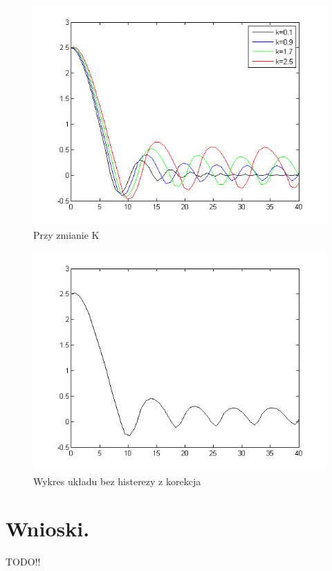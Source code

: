 \documentclass[a4paper,10pt]{article}
\begin{document}
\begin{enumerate}
\begin{figure}[!h]
    \centering
	\includegraphics[width=120mm]{CW3-korekcja-trojpolozeniowyBH-e_k.png}
	\caption{Przy zmianie K}
    \label{fig:Rysunek}
\end{figure}
\newpage
\begin{figure}[!h]
    \centering
	\includegraphics[width=120mm]{CW3-korekcja-trojpolozeniowyBH-e_a.png}
	\caption{Wykres układu bez histerezy z korekcja}
    \label{fig:Rysunek}
\end{figure}

\end{enumerate}

\newpage

\section{Wnioski.}\label{sec:wnioski}
TODO!!
\end{document}
